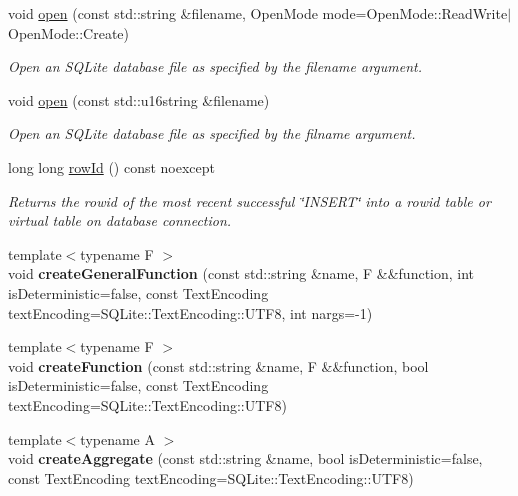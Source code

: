 \begin{DoxyCompactItemize}
\item 
void \hyperlink{class_s_q_lite_1_1_d_b_connection_aec696fc408d91e582d16727adff82445}{open} (const std\-::string \&filename, Open\-Mode mode=Open\-Mode\-::\-Read\-Write$\vert$Open\-Mode\-::\-Create)
\begin{DoxyCompactList}\small\item\em Open an S\-Q\-Lite database file as specified by the filename argument. \end{DoxyCompactList}\item 
void \hyperlink{class_s_q_lite_1_1_d_b_connection_ab5f3dbc9164bd435f6770f8625c0a79c}{open} (const std\-::u16string \&filename)
\begin{DoxyCompactList}\small\item\em Open an S\-Q\-Lite database file as specified by the filname argument. \end{DoxyCompactList}\item 
long long \hyperlink{class_s_q_lite_1_1_d_b_connection_a0959fda218112d849700b7a9b58e0505}{row\-Id} () const noexcept
\begin{DoxyCompactList}\small\item\em Returns the rowid of the most recent successful \char`\"{}\-I\-N\-S\-E\-R\-T\char`\"{} into a rowid table or virtual table on database connection. \end{DoxyCompactList}\item 
\hypertarget{class_s_q_lite_1_1_d_b_connection_adace26a4acf443ac5c8cea3fe5c913e1}{{\footnotesize template$<$typename F $>$ }\\void {\bfseries create\-General\-Function} (const std\-::string \&name, F \&\&function, int is\-Deterministic=false, const Text\-Encoding text\-Encoding=S\-Q\-Lite\-::\-Text\-Encoding\-::\-U\-T\-F8, int nargs=-\/1)}\label{class_s_q_lite_1_1_d_b_connection_adace26a4acf443ac5c8cea3fe5c913e1}

\item 
\hypertarget{class_s_q_lite_1_1_d_b_connection_ae8758a2e46148ba81aa18b71e17149b5}{{\footnotesize template$<$typename F $>$ }\\void {\bfseries create\-Function} (const std\-::string \&name, F \&\&function, bool is\-Deterministic=false, const Text\-Encoding text\-Encoding=S\-Q\-Lite\-::\-Text\-Encoding\-::\-U\-T\-F8)}\label{class_s_q_lite_1_1_d_b_connection_ae8758a2e46148ba81aa18b71e17149b5}

\item 
\hypertarget{class_s_q_lite_1_1_d_b_connection_aafcfe62eae1364129c3346500f6ad5d2}{{\footnotesize template$<$typename A $>$ }\\void {\bfseries create\-Aggregate} (const std\-::string \&name, bool is\-Deterministic=false, const Text\-Encoding text\-Encoding=S\-Q\-Lite\-::\-Text\-Encoding\-::\-U\-T\-F8)}\label{class_s_q_lite_1_1_d_b_connection_aafcfe62eae1364129c3346500f6ad5d2}


\end{DoxyCompactItemize}

